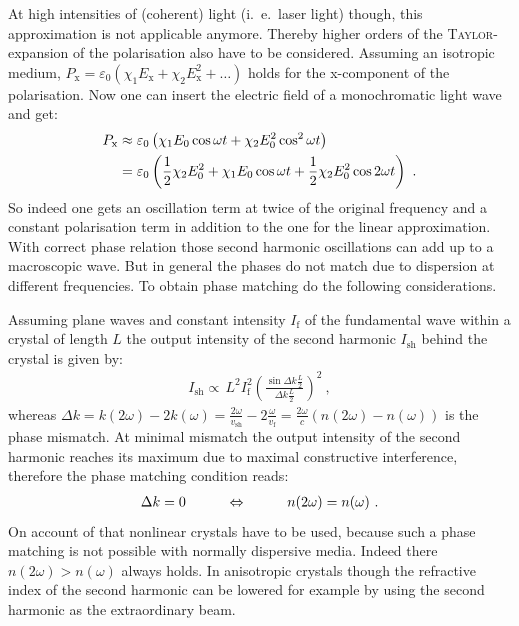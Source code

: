 \documentclass{protokoll_en}
\begin{document}
At high intensities of (coherent) light (i.\ e.\ laser light) though, this approximation is not applicable anymore. Thereby higher orders of the \textsc{Taylor}-expansion of the polarisation also have to be considered. Assuming an isotropic medium, $P_\mathrm{x} = \varepsilon_0 \left( \chi_1 E_\mathrm{x} + \chi_2 E^2_\mathrm{x} + \dots \right)$ holds for the x-component of the polarisation. Now one can insert the electric field of a monochromatic light wave and get:
\begin{align}
P_\mathrm{x} &\approx \varepsilon_0 \left( \chi_1 E_0 \cos{\omega t} + \chi_2 E^2_0 \cos^2{\omega t} \right) \\
             &= \varepsilon_0 \left( \frac{1}{2} \chi_2 E^2_0 + \chi_1 E_0 \cos{\omega t} + \frac{1}{2} \chi_2 E^2_0 \cos{2 \omega t} \right) \ \ldotp
\end{align}
So indeed one gets an oscillation term at twice of the original frequency and a constant polarisation term in addition to the one for the linear approximation. With correct phase relation those second harmonic oscillations can add up to a macroscopic wave. But in general the phases do not match due to dispersion at different frequencies. To obtain phase matching do the following considerations.

Assuming plane waves and constant intensity $I_\mathrm{f}$ of the fundamental wave within a crystal of length $L$ the output intensity of the second harmonic $I_\mathrm{sh}$ behind the crystal is given by:
\begin{align}
I_{\mathrm{sh}}\propto \, L^2 I^2_{\mathrm{f}} \left( \frac{\sin{\Delta k \frac{L}{2}}}{\Delta k \frac{L}{2}} \right)^2 \ ,
\end{align}
whereas $\Delta k = k(2\omega) - 2 k(\omega) = \frac{2\omega}{v_\mathrm{sh}} - 2 \frac{\omega}{v_\mathrm{f}} = \frac{2\omega}{c} \left( n(2\omega) - n(\omega) \right)$ is the phase mismatch. At minimal mismatch the output intensity of the second harmonic reaches its maximum due to maximal constructive interference, therefore the phase matching condition reads:
\begin{align}
\Delta k = 0 \hspace{1cm} \Leftrightarrow \hspace{1cm} n(2\omega) = n(\omega) \ \ldotp
\end{align}
On account of that nonlinear crystals have to be used, because such a phase matching is not possible with normally dispersive media. Indeed there $n(2\omega) > n(\omega)$ always holds. In anisotropic crystals though the refractive index of the second harmonic can be lowered for example by using the second harmonic as the extraordinary beam.
\end{document}
